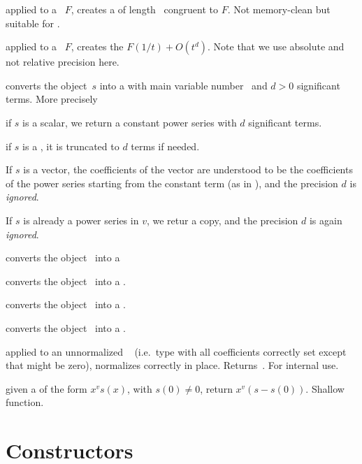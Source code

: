  applied to a ~$F$,
creates a  of length~ congruent to $F$. Not memory-clean
but suitable for .

 applied to a
~$F$, creates the  $F(1/t) + O(t^d)$. Note that
we use absolute and not relative precision here.

 converts the object~$s$ into
a  with main variable number~ and $d > 0$ significant terms.
More precisely

\item if $s$ is a scalar,  we return a constant power series with $d$
significant terms.

\item if $s$ is a , it is truncated to $d$ terms if needed.

\item If $s$ is a vector, the coefficients of the vector  are understood to
be the coefficients of the power series starting from the constant term (as
in ), and the precision $d$ is \emph{ignored}.

\item If $s$ is already a power series in $v$, we retur a copy, and
the precision $d$ is again \emph{ignored}.

 converts the object~ into a 

 converts the object~ into a .

 converts the object~ into a .

 converts the object~ into a
.

 applied to an unnormalized ~
(i.e.~type  with all coefficients correctly set except that 
might be zero), normalizes  correctly in place. Returns~.
For internal use.

 given a  of the form $x^v s(x)$, with
$s(0)\neq 0$, return $x^v(s - s(0))$. Shallow function.

\section{Constructors}

\label{se:clean}

